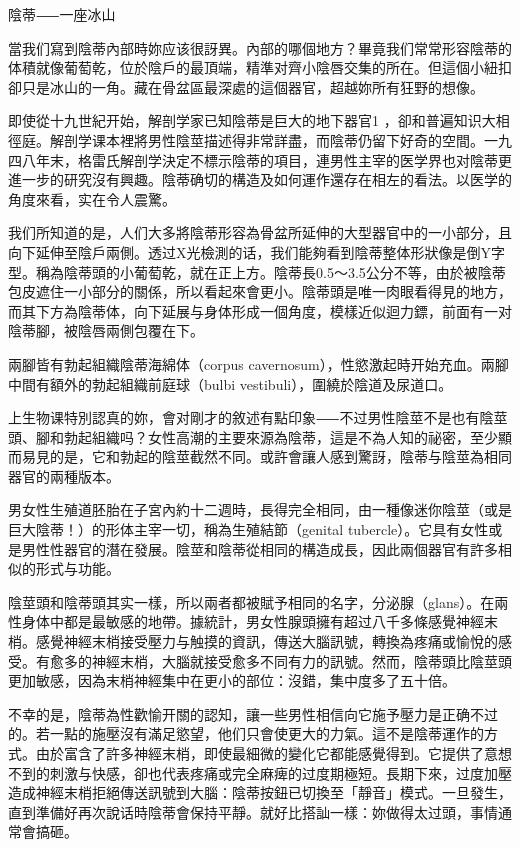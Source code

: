 \documentclass[12pt,UTF8]{ctexbook}
\begin{document}
陰蒂⸺一座冰山




當我们寫到陰蒂內部時妳应该很訝異。內部的哪個地方？畢竟我们常常形容陰蒂的体積就像葡萄乾，位於陰戶的最頂端，精準对齊小陰唇交集的所在。但這個小紐扣卻只是冰山的一角。藏在骨盆區最深處的這個器官，超越妳所有狂野的想像。

即使從十九世紀开始，解剖学家已知陰蒂是巨大的地下器官1 ，卻和普遍知识大相徑庭。解剖学课本裡將男性陰莖描述得非常詳盡，而陰蒂仍留下好奇的空間。一九四八年末，格雷氏解剖学決定不標示陰蒂的項目，連男性主宰的医学界也对陰蒂更進一步的研究沒有興趣。陰蒂确切的構造及如何運作還存在相左的看法。以医学的角度來看，实在令人震驚。





我们所知道的是，人们大多將陰蒂形容為骨盆所延伸的大型器官中的一小部分，且向下延伸至陰戶兩側。透过X光檢測的话，我们能夠看到陰蒂整体形狀像是倒Y字型。稱為陰蒂頭的小葡萄乾，就在正上方。陰蒂長0.5〜3.5公分不等，由於被陰蒂包皮遮住一小部分的關係，所以看起來會更小。陰蒂頭是唯一肉眼看得見的地方，而其下方為陰蒂体，向下延展与身体形成一個角度，模樣近似迴力鏢，前面有一对陰蒂腳，被陰唇兩側包覆在下。





兩腳皆有勃起組織陰蒂海綿体（corpus cavernosum），性慾激起時开始充血。兩腳中間有額外的勃起組織前庭球（bulbi vestibuli），圍繞於陰道及尿道口。

上生物课特別認真的妳，會对剛才的敘述有點印象⸺不过男性陰莖不是也有陰莖頭、腳和勃起組織吗？女性高潮的主要來源為陰蒂，這是不為人知的祕密，至少顯而易見的是，它和勃起的陰莖截然不同。或許會讓人感到驚訝，陰蒂与陰莖為相同器官的兩種版本。

男女性生殖道胚胎在子宮內約十二週時，長得完全相同，由一種像迷你陰莖（或是巨大陰蒂！）的形体主宰一切，稱為生殖結節（genital tubercle）。它具有女性或是男性性器官的潛在發展。陰莖和陰蒂從相同的構造成長，因此兩個器官有許多相似的形式与功能。

陰莖頭和陰蒂頭其实一樣，所以兩者都被賦予相同的名字，分泌腺（glans）。在兩性身体中都是最敏感的地帶。據統計，男女性腺頭擁有超过八千多條感覺神經末梢。感覺神經末梢接受壓力与触摸的資訊，傳送大腦訊號，轉換為疼痛或愉悅的感受。有愈多的神經末梢，大腦就接受愈多不同有力的訊號。然而，陰蒂頭比陰莖頭更加敏感，因為末梢神經集中在更小的部位：沒錯，集中度多了五十倍。

不幸的是，陰蒂為性歡愉开關的認知，讓一些男性相信向它施予壓力是正确不过的。若一點的施壓沒有滿足慾望，他们只會使更大的力氣。這不是陰蒂運作的方式。由於富含了許多神經末梢，即使最細微的變化它都能感覺得到。它提供了意想不到的刺激与快感，卻也代表疼痛或完全麻痺的过度期極短。長期下來，过度加壓造成神經末梢拒絕傳送訊號到大腦：陰蒂按鈕已切換至「靜音」模式。一旦發生，直到準備好再次說话時陰蒂會保持平靜。就好比搭訕一樣：妳做得太过頭，事情通常會搞砸。
\end{document}
